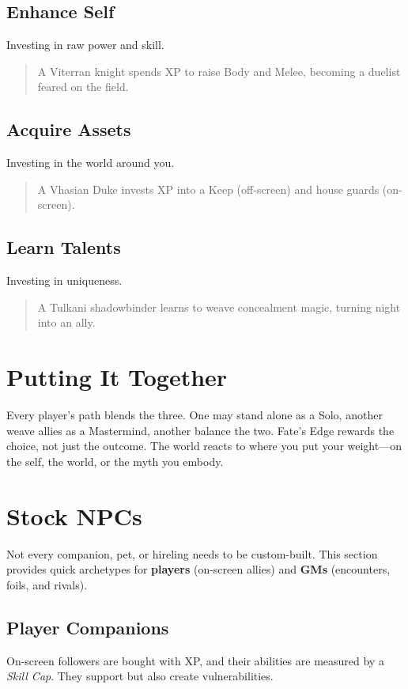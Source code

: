 \documentclass[11pt]{book}
\begin{document}
\section{Enhance Self}
Investing in raw power and skill.  
\begin{quote}
A Viterran knight spends XP to raise Body and Melee, becoming a duelist feared on the field.  
\end{quote}

\section{Acquire Assets}
Investing in the world around you.  
\begin{quote}
A Vhasian Duke invests XP into a Keep (off-screen) and house guards (on-screen).  
\end{quote}

\section{Learn Talents}
Investing in uniqueness.  
\begin{quote}
A Tulkani shadowbinder learns to weave concealment magic, turning night into an ally.  
\end{quote}

\chapter{Putting It Together}
Every player’s path blends the three. One may stand alone as a Solo, another weave allies as a Mastermind, another balance the two.  
Fate’s Edge rewards the choice, not just the outcome.  
The world reacts to where you put your weight—on the self, the world, or the myth you embody.

\chapter{Stock NPCs}

Not every companion, pet, or hireling needs to be custom-built.  
This section provides quick archetypes for \textbf{players} (on-screen allies) and \textbf{GMs} (encounters, foils, and rivals).

\section{Player Companions}
On-screen followers are bought with XP, and their abilities are measured by a \emph{Skill Cap}. They support but also create vulnerabilities.  
\end{document}
